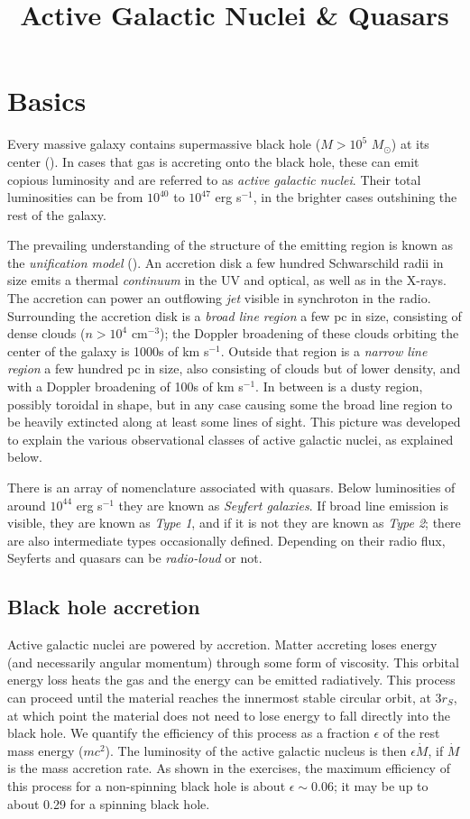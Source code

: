 \title{\bf Active Galactic Nuclei \& Quasars}

\section{Basics}

Every massive galaxy contains supermassive black hole ($M> 10^5$
$M_\odot$) at its center (\citealt{kormendy13a}). In cases that gas is
accreting onto the black hole, these can emit copious luminosity and
are referred to as {\it active galactic nuclei}. Their total
luminosities can be from $10^{40}$ to $10^{47}$ erg s$^{-1}$, in the
brighter cases outshining the rest of the galaxy.

The prevailing understanding of the structure of the emitting region
is known as the {\it unification model} (\citealt{antonucci93a,
netzer15a}). An accretion disk a few hundred Schwarschild radii in
size emits a thermal {\it continuum} in the UV and optical, as well as
in the X-rays. The accretion can power an outflowing {\it jet} visible
in synchroton in the radio. Surrounding the accretion disk is a {\it
broad line region} a few pc in size, consisting of dense clouds
($n>10^4$ cm$^{-3}$); the Doppler broadening of these clouds orbiting
the center of the galaxy is 1000s of km s$^{-1}$. Outside that region
is a {\it narrow line region} a few hundred pc in size, also
consisting of clouds but of lower density, and with a Doppler
broadening of 100s of km s$^{-1}$. In between is a dusty region,
possibly toroidal in shape, but in any case causing some the broad
line region to be heavily extincted along at least some lines of
sight. This picture was developed to explain the various observational
classes of active galactic nuclei, as explained below.

There is an array of nomenclature associated with quasars. Below
luminosities of around $10^{44}$ erg s$^{-1}$ they are known as {\it
Seyfert galaxies}. If broad line emission is visible, they are known
as {\it Type 1}, and if it is not they are known as {\it Type 2};
there are also intermediate types occasionally defined. Depending on
their radio flux, Seyferts and quasars can be {\it radio-loud} or not.

\subsection{Black hole accretion}

Active galactic nuclei are powered by accretion. Matter accreting
loses energy (and necessarily angular momentum) through some form of
viscosity. This orbital energy loss heats the gas and the energy can
be emitted radiatively. This process can proceed until the material
reaches the innermost stable circular orbit, at $3r_S$, at which point
the material does not need to lose energy to fall directly into the
black hole. We quantify the efficiency of this process as a fraction
$\epsilon$ of the rest mass energy ($mc^2$). The luminosity of the
active galactic nucleus is then $\epsilon \dot M$, if $\dot M$ is the
mass accretion rate. As shown in the exercises, the maximum efficiency
of this process for a non-spinning black hole is about $\epsilon \sim
0.06$; it may be up to about 0.29 for a spinning black hole.

